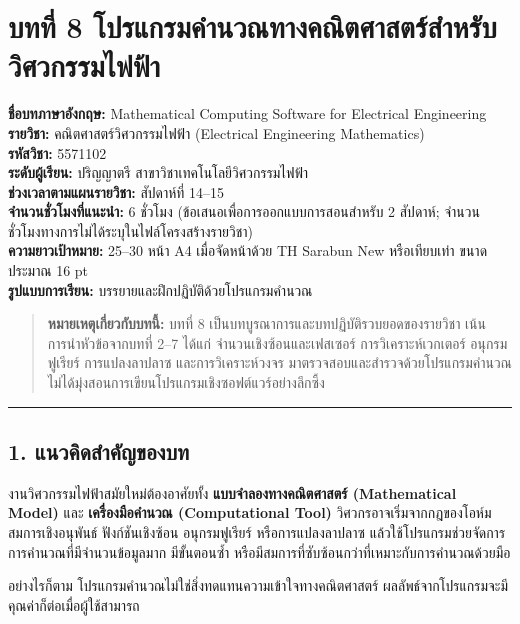 \section{บทที่ 8 โปรแกรมคำนวณทางคณิตศาสตร์สำหรับวิศวกรรมไฟฟ้า}

\textbf{ชื่อบทภาษาอังกฤษ:} Mathematical Computing Software for Electrical Engineering \\
\textbf{รายวิชา:} คณิตศาสตร์วิศวกรรมไฟฟ้า (Electrical Engineering Mathematics) \\
\textbf{รหัสวิชา:} 5571102 \\
\textbf{ระดับผู้เรียน:} ปริญญาตรี สาขาวิชาเทคโนโลยีวิศวกรรมไฟฟ้า \\
\textbf{ช่วงเวลาตามแผนรายวิชา:} สัปดาห์ที่ 14–15 \\
\textbf{จำนวนชั่วโมงที่แนะนำ:} 6 ชั่วโมง (ข้อเสนอเพื่อการออกแบบการสอนสำหรับ 2 สัปดาห์; จำนวนชั่วโมงทางการไม่ได้ระบุในไฟล์โครงสร้างรายวิชา) \\
\textbf{ความยาวเป้าหมาย:} 25–30 หน้า A4 เมื่อจัดหน้าด้วย TH Sarabun New หรือเทียบเท่า ขนาดประมาณ 16 pt \\
\textbf{รูปแบบการเรียน:} บรรยายและฝึกปฏิบัติด้วยโปรแกรมคำนวณ \\

\begin{quote}
\textbf{หมายเหตุเกี่ยวกับบทนี้:} บทที่ 8 เป็นบทบูรณาการและบทปฏิบัติรวบยอดของรายวิชา เน้นการนำหัวข้อจากบทที่ 2–7 ได้แก่ จำนวนเชิงซ้อนและเฟสเซอร์ การวิเคราะห์เวกเตอร์ อนุกรมฟูเรียร์ การแปลงลาปลาซ และการวิเคราะห์วงจร มาตรวจสอบและสำรวจด้วยโปรแกรมคำนวณ ไม่ได้มุ่งสอนการเขียนโปรแกรมเชิงซอฟต์แวร์อย่างลึกซึ้ง
\end{quote}

\par\noindent\rule{\textwidth}{0.4pt}\par

\subsection{1. แนวคิดสำคัญของบท}

งานวิศวกรรมไฟฟ้าสมัยใหม่ต้องอาศัยทั้ง \textbf{แบบจำลองทางคณิตศาสตร์ (Mathematical Model)} และ \textbf{เครื่องมือคำนวณ (Computational Tool)} วิศวกรอาจเริ่มจากกฎของโอห์ม สมการเชิงอนุพันธ์ ฟังก์ชันเชิงซ้อน อนุกรมฟูเรียร์ หรือการแปลงลาปลาซ แล้วใช้โปรแกรมช่วยจัดการการคำนวณที่มีจำนวนข้อมูลมาก มีขั้นตอนซ้ำ หรือมีสมการที่ซับซ้อนกว่าที่เหมาะกับการคำนวณด้วยมือ

อย่างไรก็ตาม โปรแกรมคำนวณไม่ใช่สิ่งทดแทนความเข้าใจทางคณิตศาสตร์ ผลลัพธ์จากโปรแกรมจะมีคุณค่าก็ต่อเมื่อผู้ใช้สามารถ

